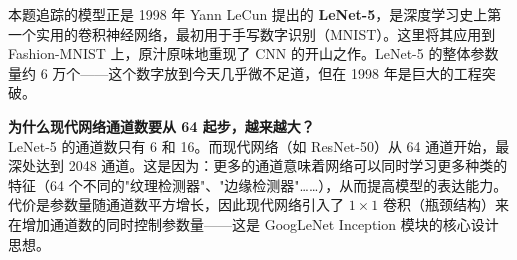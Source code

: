 \documentclass[a4paper,11pt]{ctexart}
\begin{document}
\begin{solutionbox}[参考答案与详细解析]
    \begin{keybox}
        本题追踪的模型正是 1998 年 Yann LeCun 提出的 \textbf{LeNet-5}，是深度学习史上第一个实用的卷积神经网络，最初用于手写数字识别（MNIST）。这里将其应用到 Fashion-MNIST 上，原汁原味地重现了 CNN 的开山之作。LeNet-5 的整体参数量约 6 万个——这个数字放到今天几乎微不足道，但在 1998 年是巨大的工程突破。
    \end{keybox}
\end{solutionbox}

\begin{appbox}[现实应用场景]
    \textbf{为什么现代网络通道数要从 64 起步，越来越大？}\\
    LeNet-5 的通道数只有 6 和 16。而现代网络（如 ResNet-50）从 64 通道开始，最深处达到 2048 通道。这是因为：更多的通道意味着网络可以同时学习更多种类的特征（64 个不同的"纹理检测器"、"边缘检测器"……），从而提高模型的表达能力。代价是参数量随通道数平方增长，因此现代网络引入了 $1\times1$ 卷积（瓶颈结构）来在增加通道数的同时控制参数量——这是 GoogLeNet Inception 模块的核心设计思想。
\end{appbox}
\end{document}

